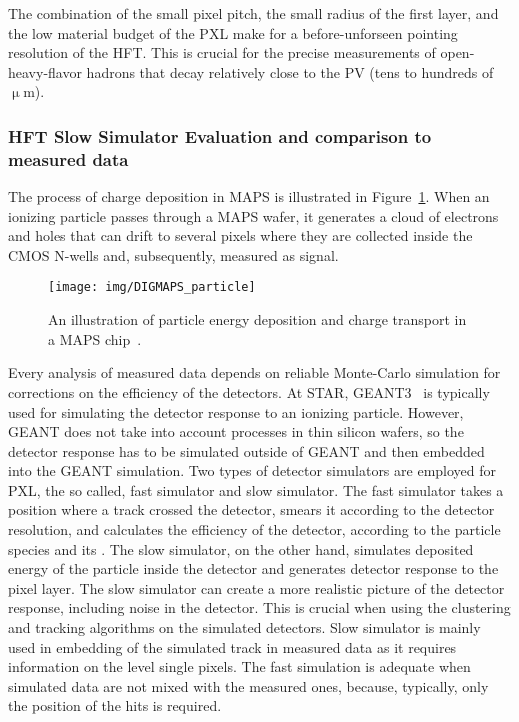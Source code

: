The combination of the small pixel pitch, the small radius of the first layer, and the low material budget of the PXL make for a before-unforseen pointing resolution of the HFT\@. This is crucial for the precise measurements of open-heavy-flavor hadrons that decay relatively close to the PV (tens to hundreds of $\upmu$m)\@.  

\subsubsection{HFT Slow Simulator Evaluation and comparison to measured data}
The process of charge deposition in MAPS is illustrated in Figure~\ref{DigmapsIllustration}\@.
When an ionizing particle passes through a MAPS wafer, it generates a cloud of electrons and holes that can drift to several pixels where they are collected inside the CMOS N-wells and, subsequently, measured as signal.  

\begin{figure}[!htb]
\begin{center}
 \texttt{[image: img/DIGMAPS\_particle]}\\
\end{center}
\caption[An illustration of particle energy deposition and charge transport in a MAPS chip.]{\label{DigmapsIllustration}An illustration of particle energy deposition and charge transport in a MAPS chip~\cite{DIGMAPS}.}
\end{figure}

Every analysis of measured data depends on reliable Monte-Carlo simulation for corrections on the efficiency of the detectors. At STAR, GEANT3~\cite{GEANT} is typically used for simulating the detector response to an ionizing particle. However, GEANT does not take into account processes in thin silicon wafers, so the detector response has to be simulated outside of GEANT and then embedded into the GEANT simulation. Two types of detector simulators are employed for PXL, the so called, fast simulator and slow simulator. The fast simulator takes a position where a track crossed the detector, smears it according to the detector resolution, and calculates the efficiency of the detector, according to the particle species and its \pt\@. The slow simulator, on the other hand, simulates deposited energy of the particle inside the detector and generates detector response to the pixel layer. The slow simulator can create a more realistic picture of the detector response, including noise in the detector. This is crucial when using the clustering and tracking algorithms on the simulated detectors. Slow simulator is mainly used in embedding of the simulated track in measured data as it requires information on the level single pixels. The fast simulation is adequate when simulated data are not mixed with the measured ones, because, typically, only the position of the hits is required.

